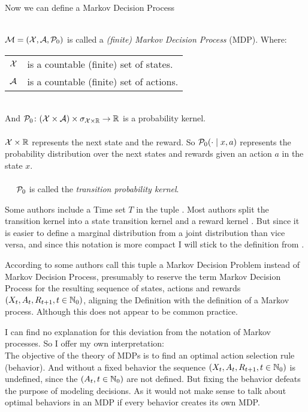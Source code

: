 Now we can define a Markov Decision Process


\begin{definition} \leavevmode \\ 
	\(\mathcal{M}=(\mathcal{X},\mathcal{A},\mathcal{P}_0) \) is called a \emph{(finite) Markov Decision Process} (MDP). Where:
	\par\begin{tabular}{l l}
		\(\mathcal{X}\) & is a countable (finite) set of states.\\
		\(\mathcal{A}\) & is a countable (finite) set of actions.
	\end{tabular}\\
	And \(\mathcal{P}_0\colon (\mathcal{X}\times\mathcal{A}) \times \sigma_{\mathcal{X}\times\mathbb{R}} \to \mathbb{R}\) is a probability kernel.\\ \\
	\(\mathcal{X}\times\mathbb{R}\) represents the next state and the reward. So \(\mathcal{P}_0(\cdot\mid x,a) \) represents the probability distribution over the next states and rewards given an action \(a\) in the state \(x\).
	\\ \\
	\(\quad\) \(\mathcal{P}_0\) is called the \emph{transition probability kernel}. 
\end{definition}
\begin{remark}
	Some authors include a Time set \(T\) in the tuple \parencite[e.g.][]{putermanMarkovDecisionProcesses2014}. Most authors split the transition kernel into a state transition kernel and a reward kernel \parencite[e.g.][]{putermanMarkovDecisionProcesses2014}. But since it is easier to define a marginal distribution from a joint distribution than vice versa, and since this notation is more compact I will stick to the definition from \textcite{szepesvariAlgorithmsReinforcementLearning2010}.
\end{remark}

According to \textcite{putermanMarkovDecisionProcesses2014} some authors call this tuple a Markov Decision Problem instead of Markov Decision Process, presumably to reserve the term Markov Decision Process for the resulting sequence of states, actions and rewards \((X_t,A_t,R_{t+1},t\in\mathbb{N}_0)\), aligning the Definition with the definition of a Markov process. Although this does not appear to be common practice.

I can find no explanation for this deviation from the notation of Markov processes. So I offer my own interpretation:\\
The objective of the theory of MDPs is to find an optimal action selection rule (behavior). And without a fixed behavior the sequence \((X_t, A_t, R_{t+1}, t\in\mathbb{N}_0 )\) is undefined, since the \((A_t,t\in\mathbb{N}_0)\) are not defined. But fixing the behavior defeats the purpose of modeling decisions. As it would not make sense to talk about optimal behaviors in an MDP if every behavior creates its own MDP.\\ 

